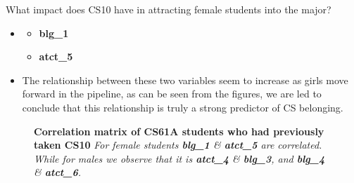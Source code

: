 \documentclass{beamer}                  %
\begin{document}
\begin{frame}{What impact does CS10 have in attracting female students into the major?}

  \begin{itemize}
  \item 
    \begin{itemize}
      \item \textbf{blg\_1}
      \item \textbf{atct\_5}
    \end{itemize}
  \item The relationship between these two variables seem to increase as girls move forward in the pipeline, as can be seen from the figures,  we are led to conclude that this relationship is truly a strong predictor of CS belonging.
  \end{itemize}

\end{frame}

\begin{frame}
  \begin{figure}[!htbp]
      \centering
  \caption{\textbf{Correlation matrix of CS61A students who had previously taken CS10}
  \textit{For female students \textbf{blg\_1} \& \textbf{atct\_5} are correlated. While for males we observe that it is \textbf{atct\_4} \&  \textbf{blg\_3}, and \textbf{blg\_4} \& \textbf{atct\_6}.}}
  \label{corrHeatMapFemaleCS10CS61A}
  \end{figure}
\end{frame}
\end{document}
